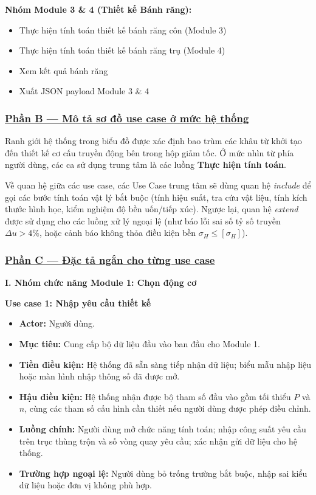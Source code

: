 \documentclass[a4paper]{article}
\begin{document}
\textbf{Nhóm Module 3 \& 4 (Thiết kế Bánh răng):}
\begin{itemize}
\item Thực hiện tính toán thiết kế bánh răng côn (Module 3)
\item Thực hiện tính toán thiết kế bánh răng trụ (Module 4)
\item Xem kết quả bánh răng
\item Xuất JSON payload Module 3 \& 4
\end{itemize}


\subsubsection*{\uline{Phần B --- Mô tả sơ đồ use case ở mức hệ thống}}

Ranh giới hệ thống trong biểu đồ được xác định bao trùm các khâu từ khởi tạo đến thiết kế cơ cấu truyền động bên trong hộp giảm tốc. Ở mức nhìn từ phía người dùng, các ca sử dụng trung tâm là các luồng \textbf{Thực hiện tính toán}. 

Về quan hệ giữa các use case, các Use Case trung tâm sẽ dùng quan hệ \textit{include} để gọi các bước tính toán vật lý bắt buộc (tính hiệu suất, tra cứu vật liệu, tính kích thước hình học, kiểm nghiệm độ bền uốn/tiếp xúc). Ngược lại, quan hệ \textit{extend} được sử dụng cho các luồng xử lý ngoại lệ (như báo lỗi sai số tỷ số truyền \(\Delta u > 4\%\), hoặc cảnh báo không thỏa điều kiện bền \(\sigma_H \le [\sigma_H]\)).

\subsubsection*{\uline{Phần C --- Đặc tả ngắn cho từng use case}}

\vspace{0.5cm}
\textbf{\large I. Nhóm chức năng Module 1: Chọn động cơ}
\vspace{0.2cm}

\textbf{Use case 1: Nhập yêu cầu thiết kế}
\begin{itemize}
\item \textbf{Actor:} Người dùng.
\item \textbf{Mục tiêu:} Cung cấp bộ dữ liệu đầu vào ban đầu cho Module 1.
\item \textbf{Tiền điều kiện:} Hệ thống đã sẵn sàng tiếp nhận dữ liệu; biểu mẫu nhập liệu hoặc màn hình nhập thông số đã được mở.
\item \textbf{Hậu điều kiện:} Hệ thống nhận được bộ tham số đầu vào gồm tối thiểu \(P\) và \(n\), cùng các tham số cấu hình cần thiết nếu người dùng được phép điều chỉnh.
\item \textbf{Luồng chính:} Người dùng mở chức năng tính toán; nhập công suất yêu cầu trên trục thùng trộn và số vòng quay yêu cầu; xác nhận gửi dữ liệu cho hệ thống.
\item \textbf{Trường hợp ngoại lệ:} Người dùng bỏ trống trường bắt buộc, nhập sai kiểu dữ liệu hoặc đơn vị không phù hợp.
\end{itemize}
\end{document}
